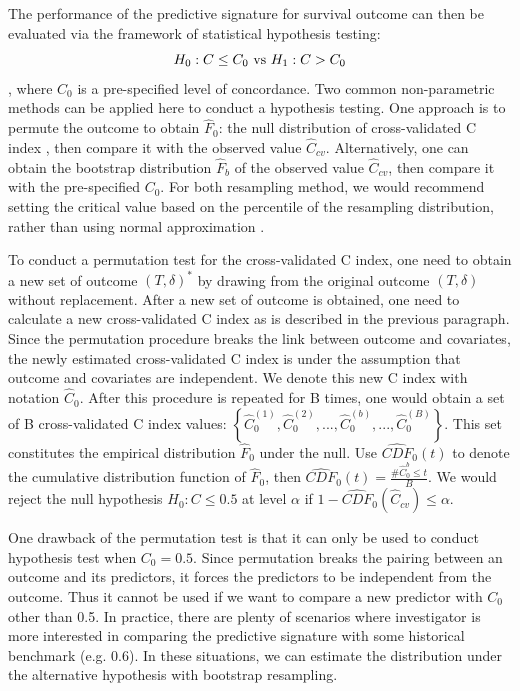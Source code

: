 \documentclass[11pt]{article}
\begin{document}
	\par The performance of the predictive signature for survival outcome can then be evaluated via the framework of statistical hypothesis testing: $$H_0: C \leq C_{0} \textnormal{ vs } H_{1}: C > C_{0}$$, where $C_0$ is a pre-specified level of concordance. Two common non-parametric methods can be applied here to conduct a hypothesis testing. One approach is to permute the outcome to obtain $\hat{F}_{0}$: the null distribution of cross-validated C index \citep{Simon2011}, then compare it with the observed value $\hat{C}_{cv}$. Alternatively, one can obtain the bootstrap distribution $\hat{F}_b$ of the observed value $\hat{C}_{cv}$, then compare it with the pre-specified $C_0$. For both resampling method, we would recommend setting the critical value based on the percentile of the resampling distribution, rather than using normal approximation \citep{Efron1982}. 

	\par To conduct a permutation test for the cross-validated C index, one need to obtain a new set of outcome $(T,\delta)^{*}$ by drawing from the original outcome $(T, \delta)$ without replacement. After a new set of outcome is obtained, one need to calculate a new cross-validated C index as is described in the previous paragraph. Since the permutation procedure breaks the link between outcome and covariates, the newly estimated cross-validated C index is under the assumption that outcome and covariates are independent. We denote this new C index with notation $\hat{C}_{0}$. After this procedure is repeated for B times, one would obtain a set of B cross-validated C index values: $\left\{\hat{C}_{0}^{(1)}, \hat{C}_{0}^{(2)}, ... ,\hat{C}_{0}^{(b)}, ... , \hat{C}_{0}^{(B)} \right\}$. This set constitutes the empirical distribution $\hat{F}_{0}$ under the null. Use $\widehat{CDF}_{0}(t)$ to denote the cumulative distribution function of $\hat{F}_{0}$, then $\widehat{CDF}_{0}(t) = \frac{\# \hat{C}_{0}^{b} \leq t}{B}$. We would reject the null hypothesis $H_{0}: C \leq 0.5$ at level $\alpha$ if $ 1 - \widehat{CDF}_{0}(\hat{C}_{cv}) \leq \alpha$.

	\par One drawback of the permutation test is that it can only be used to conduct hypothesis test when $C_0 = 0.5$. Since permutation breaks the pairing between an outcome and its predictors, it forces the predictors to be independent from the outcome. Thus it cannot be used if we want to compare a new predictor with $C_0$ other than 0.5. In practice, there are plenty of scenarios where investigator is more interested in comparing the predictive signature with some historical benchmark (e.g. 0.6). In these situations, we can estimate the distribution under the alternative hypothesis with bootstrap resampling. 
\end{document}
